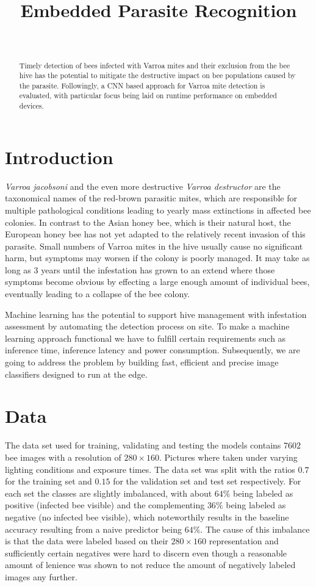 \documentclass[12pt,a4paper]{article}
\title{Embedded Parasite Recognition}
\author{
 \authorname{Alexander Sifel} \\
 \email{alex.sifel@gmail.com}
}
\begin{document}
\maketitle

\begin{abstract}
Timely detection of bees infected with Varroa mites and their exclusion from the bee hive has the potential to mitigate the destructive impact on bee populations caused by the parasite. Followingly, a CNN based approach for Varroa mite detection is evaluated, with particular focus being laid on runtime performance on embedded devices.
\end{abstract}

\section{Introduction}
\textit{Varroa jacobsoni} and the even more destructive \textit{Varroa destructor} are the taxonomical names of the red-brown parasitic mites, which are responsible for multiple pathological conditions leading to yearly mass extinctions in affected bee colonies. In contrast to the Asian honey bee, which is their natural host, the European honey bee has not yet adapted to the relatively recent invasion of this parasite. Small numbers of Varroa mites in the hive usually cause no significant harm, but symptoms may worsen if the colony is poorly managed. It may take as long as 3 years until the infestation has grown to an extend where those symptoms become obvious by effecting a large enough amount of individual bees, eventually leading to a collapse of the bee colony.

Machine learning has the potential to support hive management with infestation assessment by automating the detection process on site. To make a machine learning approach functional we have to fulfill certain requirements such as inference time, inference latency and power consumption. Subsequently, we are going to address the problem by building fast, efficient and precise image classifiers designed to run at the edge. 

\section{Data}

The data set used for training, validating and testing the models contains $7602$ bee images with a resolution of $280 \times 160$. Pictures where taken under varying lighting conditions and exposure times. The data set was split with the ratios $0.7$ for the training set and $0.15$ for the validation set and test set respectively. For each set the classes are slightly imbalanced, with about $64 \%$ being labeled as positive (infected bee visible) and the complementing $36 \%$ being labeled as negative (no infected bee visible), which noteworthily results in the baseline accuracy resulting from a naive predictor being $64 \%$. The cause of this imbalance is that the data were labeled based on their $280 \times 160$ representation and sufficiently certain negatives were hard to discern even though a reasonable amount of lenience was shown to not reduce the amount of negatively labeled images any further.
\end{document}
